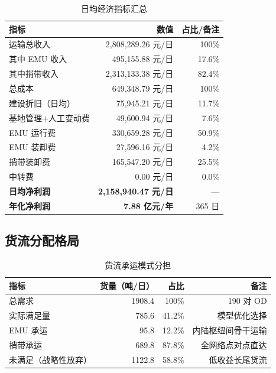 \documentclass[12pt,a4paper,fontset=none]{ctexart}
\begin{document}
\begin{table}[H]
\centering
\caption{日均经济指标汇总}
\label{tab:econ_results}
\begin{tabular}{lrr}
\toprule
指标 & 数值 & 占比/备注 \\
\midrule
运输总收入                & 2,808,289.26 元/日 & 100\% \\
\quad 其中 EMU 收入        & 495,155.88 元/日   & 17.6\% \\
\quad 其中捎带收入          & 2,313,133.38 元/日 & 82.4\% \\
\midrule
总成本                    & 649,348.79 元/日   & 100\% \\
\quad 建设折旧（日均）      & 75,945.21 元/日    & 11.7\% \\
\quad 基地管理+人工变动费   & 49,600.94 元/日    & 7.6\% \\
\quad EMU 运行费            & 330,659.28 元/日   & 50.9\% \\
\quad EMU 装卸费            & 27,596.16 元/日    & 4.2\% \\
\quad 捎带装卸费            & 165,547.20 元/日   & 25.5\% \\
\quad 中转费                & 0.00 元/日         & 0.0\% \\
\midrule
\textbf{日均净利润}        & \textbf{2,158,940.47 元/日} & — \\
\textbf{年化净利润}        & \textbf{7.88 亿元/年}       & 365 日 \\
\bottomrule
\end{tabular}
\end{table}

\subsection{货流分配格局}

\begin{table}[H]
\centering
\caption{货流承运模式分担}
\label{tab:flow_split}
\begin{tabular}{lrrr}
\toprule
指标 & 货量（吨/日） & 占比 & 备注 \\
\midrule
总需求                    & 1908.4  & 100\%   & 190 对 OD \\
实际满足量                & 785.6   & 41.2\%  & 模型优化选择 \\
\quad EMU 承运             & 95.8    & 12.2\%  & 内陆枢纽间骨干运输 \\
\quad 捎带承运             & 689.8   & 87.8\%  & 全网络点对点直达 \\
未满足（战略性放弃）       & 1122.8  & 58.8\%  & 低收益长尾货流 \\
\bottomrule
\end{tabular}
\end{table}
\end{document}
